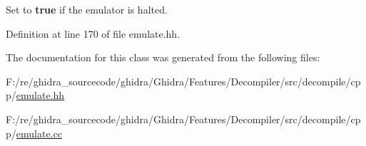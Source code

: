 Set to {\bfseries{true}} if the emulator is halted. 



Definition at line 170 of file emulate.\+hh.



The documentation for this class was generated from the following files\+:\begin{DoxyCompactItemize}
\item 
F\+:/re/ghidra\+\_\+sourcecode/ghidra/\+Ghidra/\+Features/\+Decompiler/src/decompile/cpp/\mbox{\hyperlink{emulate_8hh}{emulate.\+hh}}\item 
F\+:/re/ghidra\+\_\+sourcecode/ghidra/\+Ghidra/\+Features/\+Decompiler/src/decompile/cpp/\mbox{\hyperlink{emulate_8cc}{emulate.\+cc}}\end{DoxyCompactItemize}
